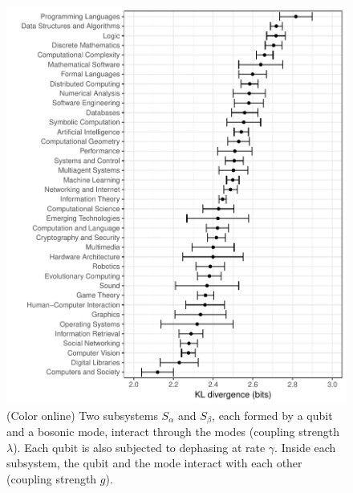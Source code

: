 \documentclass[%
reprint,
amsmath,amssymb,
aps,
pra,
]{revtex4-1}
\begin{document}
\begin{figure}[b!]
\includegraphics[scale=0.4]{fig1.pdf}
\caption{\label{fig1} (Color online) Two subsystems $S_\alpha$ and $S_\beta$, each formed by a qubit and a bosonic mode, interact through the modes (coupling strength $\lambda$). Each qubit is also subjected to dephasing at rate $\gamma$. Inside each subsystem, the qubit and the mode interact with each other (coupling strength $g$). }
\end{figure}
\end{document}
